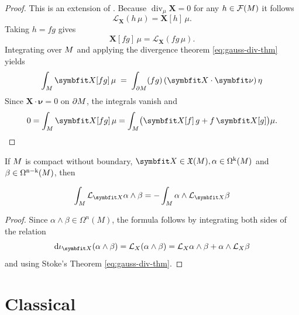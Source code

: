 \begin{proof}
This is an extension of \cite[Corollary 7.2.11]{abraham1988manifolds}. 
Because $\operatorname{div}_{\mu}\bm{X}=0$ for any $h\in\mathcal F(M)$ it follows
\[
\mathcal{L}_{\bm{X}}(h\,\mu)=\bm{X}[h]\,\mu.
\]
Taking $h=fg$ gives
\[
\bm{X}[fg]\,\mu
= \mathcal{L}_{\bm{X}}(fg\,\mu).
\]
Integrating over $M$ and applying the divergence theorem \eqref{eq:gauss-div-thm} yields
\[
\int_{\PlaneManifold} \bm{X}[fg]\,\mu
   \;=\;
\int_{\PlaneBoundary} (fg)\,(\bm{X}\cdot\bm{\nu})\,\eta
\]
Since $\bm{X} \cdot \bm{\nu}=0$ on $\partial M$, the integrals vanish and
\[
0
=\int_{\PlaneManifold} \bm{X}[fg]\,\mu
  =\int_{\PlaneManifold} \bigl(\bm{X}[f]\,g + f\,\bm{X}[g]\bigr)\mu.
\]
\end{proof}

\begin{proposition}
\label{prop:7212}
\citep[Corollary 7.2.12]{abraham1988manifolds}
If \(M\) is compact without boundary, $\bm{X} \in \mathfrak{X}(\PlaneManifold), \alpha \in \Omega^{\mathrm{k}}(\PlaneManifold)$ and $\beta \in \Omega^{\mathrm{n}-\mathrm{k}}(M)$, then

$$
\int_{\PlaneManifold} \mathcal{L}_{\bm{X}} \alpha \wedge \beta=-\int_{\PlaneManifold} \alpha \wedge \mathcal{L}_{\bm{X}} \beta
$$

\end{proposition}
\begin{proof}
Since $\alpha \wedge \beta \in \Omega^n(M)$, the formula follows by integrating both sides of the relation 
\[
\dd \interior{\bm{X}}{(\alpha \wedge \beta)}=\mathcal{L}_X(\alpha \wedge \beta)=\mathcal{L}_X \alpha \wedge \beta+\alpha \wedge \mathcal{L}_X \beta
\]
and using Stoke's Theorem \eqref{eq:gauss-div-thm}.
\end{proof}

\iffalse
\section{Classical}

